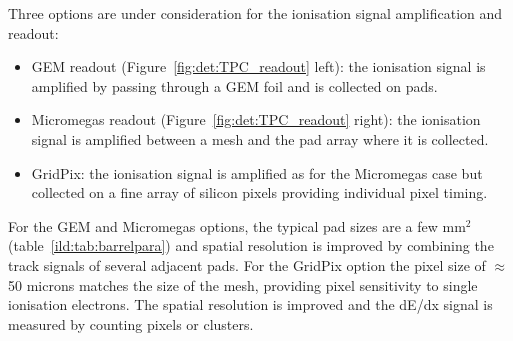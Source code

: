 Three options are under consideration for the ionisation signal amplification and readout:
\begin{itemize}
    \item GEM readout (Figure~\ref{fig:det:TPC_readout} left): the ionisation signal is amplified by passing through a GEM foil and is collected on pads.
    \item Micromegas readout (Figure~\ref{fig:det:TPC_readout} right): the ionisation signal is amplified between a mesh and the pad array where it is collected.
    \item GridPix: the ionisation signal is amplified as for the Micromegas case but collected on a fine array of silicon pixels providing individual pixel timing.
\end{itemize}
\vspace{0.5cm}
For the GEM and Micromegas options, the typical pad sizes are a few mm$^2$ (table~\ref{ild:tab:barrelpara}) and spatial resolution is improved by combining the track signals of several adjacent pads. For the GridPix option the pixel size of $\approx$50 microns matches the size of the mesh, providing pixel sensitivity to single ionisation electrons. The spatial resolution is improved and the dE/dx signal is measured by counting pixels or clusters. 

